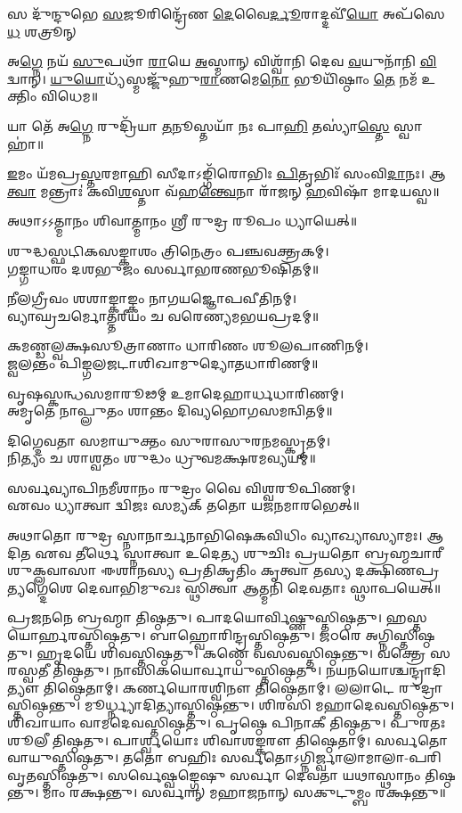 {𑌸 𑌦𑍁᳴𑌨𑍍𑌦𑍁𑌭𑍇 \ul{𑌸}\-𑌜𑍂𑌰𑌿𑌨𑍍𑌦𑍍𑌰𑍇᳴𑌣 \ul{𑌦𑍇}\-𑌵𑍈\-\ul{𑌰𑍍𑌦𑍂}\-𑌰𑌾𑌦𑍍𑌦𑌵𑍀᳴\-\ul{𑌯𑍋} 𑌅𑌪᳴𑌸𑍇\-\ul{𑌧} 𑌶𑌤𑍍𑌰𑍂𑌨𑍍}

𑌅\-\ul{𑌗𑍍𑌨𑍇} 𑌨𑌯᳴ \ul{𑌸𑍁}\-𑌪𑌥𑌾᳴ \ul{𑌰𑌾}\-𑌯𑍇 \ul{𑌅}\-𑌸𑍍𑌮𑌾𑌨𑍍 𑌵𑌿𑌶𑍍𑌵𑌾᳴𑌨𑌿 𑌦𑍇𑌵 \ul{𑌵}\-𑌯𑍁𑌨𑌾᳴𑌨𑌿 \ul{𑌵𑌿}\-𑌦𑍍𑌵𑌾𑌨𑍍। 
\-\ul{𑌯𑍁}\-\-\ul{𑌯𑍋}\-𑌧𑍍𑌯᳴𑌸𑍍𑌮𑌜𑍍𑌜𑍁᳴𑌹𑍁\-\ul{𑌰𑌾}\-𑌣𑌮𑍇\-\ul{𑌨𑍋} 𑌭𑍂𑌯𑌿᳴𑌷𑍍𑌠𑌾𑌂 \ul{𑌤𑍇} 𑌨𑌮᳴ 𑌉𑌕𑍍𑌤𑌿𑌂 𑌵𑌿𑌧𑍇𑌮॥\\

𑌯𑌾 𑌤𑍇᳴ 𑌅\-\ul{𑌗𑍍𑌨𑍇} 𑌰𑍁𑌦𑍍𑌰𑌿᳴𑌯𑌾 \ul{𑌤}\-𑌨𑍂𑌸𑍍𑌤𑌯𑌾᳴ 𑌨𑌃 𑌪𑌾\-\ul{𑌹𑌿} 𑌤𑌸𑍍𑌯𑌾॑\-\ul{𑌸𑍍𑌤𑍇} 𑌸𑍍𑌵𑌾𑌹𑌾॑॥

\-\ul{𑌇}\-𑌮𑌂 𑌯᳴𑌮𑌪𑍍𑌰\-\ul{𑌸𑍍𑌤}\-𑌰𑌮𑌾𑌹𑌿 𑌸𑍀𑌦𑌾𑌽𑌙𑍍𑌗𑌿᳴𑌰𑍋𑌭𑌿𑌃 \ul{𑌪𑌿}\-𑌤𑍃𑌭𑌿𑌃᳴ 𑌸𑌂𑌵𑌿\-\ul{𑌦𑌾}\-𑌨𑌃। 𑌆\-\ul{𑌤𑍍𑌵𑌾} 𑌮𑌨𑍍𑌤𑍍𑌰𑌾𑌃॑ 𑌕𑌵𑌿\-\ul{𑌶}\-𑌸𑍍𑌤𑌾 𑌵᳴𑌹\-\ul{𑌨𑍍𑌤𑍍𑌵𑍇}\-𑌨𑌾 𑌰𑌾᳴𑌜𑌨𑍍 \ul{𑌹}\-𑌵𑌿𑌷𑌾᳴ 𑌮𑌾𑌦𑌯𑌸𑍍𑌵॥\\
{\small \closesection}

𑌅𑌥𑌾𑌽𑌽𑌤𑍍𑌮𑌾𑌨𑌂 𑌶𑌿𑌵𑌾𑌤𑍍𑌮𑌾𑌨𑌂 𑌶𑍍𑌰𑍀 𑌰𑍁𑌦𑍍𑌰 𑌰𑍂𑌪𑌂 𑌧𑍍𑌯𑌾𑌯𑍇𑌤𑍍॥

𑌶𑍁𑌦𑍍𑌧𑌸𑍍𑌫𑌟𑌿𑌕𑌸𑌙𑍍𑌕𑌾𑌶𑌂 𑌤𑍍𑌰𑌿𑌨𑍇𑌤𑍍𑌰𑌂 𑌪𑌞𑍍𑌚𑌵𑌕𑍍𑌤𑍍𑌰𑌕𑌮𑍍।\\
𑌗𑌙𑍍𑌗𑌾𑌧𑌰𑌂 𑌦𑌶𑌭𑍁𑌜𑌂 𑌸𑌰𑍍𑌵𑌾𑌭𑌰𑌣𑌭𑍂𑌷𑌿𑌤𑌮𑍍॥

𑌨𑍀𑌲𑌗𑍍𑌰𑍀𑌵𑌂 𑌶𑌶𑌾𑌙𑍍𑌕𑌾𑌙𑍍𑌕𑌂 𑌨𑌾𑌗𑌯𑌜𑍍𑌞𑍋𑌪𑌵𑍀𑌤𑌿𑌨𑌮𑍍।\\
𑌵𑍍𑌯𑌾𑌘𑍍𑌰𑌚𑌰𑍍𑌮𑍋𑌤𑍍𑌤𑌰𑍀𑌯𑌂 𑌚 𑌵𑌰𑍇𑌣𑍍𑌯𑌮𑌭𑌯𑌪𑍍𑌰𑌦𑌮𑍍॥

𑌕𑌮𑌣𑍍𑌡𑌲𑍍𑌵𑌕𑍍𑌷𑌸𑍂𑌤𑍍𑌰𑌾𑌣𑌾𑌂 𑌧𑌾𑌰𑌿𑌣𑌂 𑌶𑍂𑌲𑌪𑌾𑌣𑌿𑌨𑌮𑍍।\\
𑌜𑍍𑌵𑌲𑌨𑍍𑌤𑌂 𑌪𑌿𑌙𑍍𑌗𑌲𑌜𑌟𑌾𑌶𑌿𑌖𑌾𑌮𑍁𑌦𑍍𑌯𑍋𑌤𑌧𑌾𑌰𑌿𑌣𑌮𑍍॥

𑌵𑍃𑌷𑌸𑍍𑌕𑌨𑍍𑌧𑌸𑌮𑌾𑌰𑍂𑌢𑌮𑍍 𑌉𑌮𑌾𑌦𑍇𑌹𑌾𑌰𑍍𑌧𑌧𑌾𑌰𑌿𑌣𑌮𑍍।\\
𑌅𑌮𑍃𑌤𑍇  𑌨𑌾𑌪𑍍𑌲𑍁𑌤𑌂 𑌶𑌾𑌨𑍍𑌤𑌂 𑌦𑌿𑌵𑍍𑌯𑌭𑍋𑌗𑌸𑌮𑌨𑍍𑌵𑌿𑌤𑌮𑍍॥

𑌦𑌿𑌗𑍍𑌦𑍇𑌵𑌤𑌾 𑌸𑌮𑌾𑌯𑍁𑌕𑍍𑌤𑌂 𑌸𑍁𑌰𑌾𑌸𑍁𑌰𑌨𑌮𑌸𑍍𑌕𑍃𑌤𑌮𑍍।\\
𑌨𑌿𑌤𑍍𑌯𑌂 𑌚 𑌶𑌾𑌶𑍍𑌵𑌤𑌂 𑌶𑍁𑌦𑍍𑌧𑌂 𑌧𑍍𑌰𑍁𑌵𑌮𑌕𑍍𑌷𑌰𑌮𑌵𑍍𑌯𑌯𑌮𑍍॥

𑌸𑌰𑍍𑌵𑌵𑍍𑌯𑌾𑌪𑌿𑌨𑌮𑍀𑌶𑌾𑌨𑌂 𑌰𑍁𑌦𑍍𑌰𑌂 𑌵𑍈 𑌵𑌿𑌶𑍍𑌵𑌰𑍂𑌪𑌿𑌣𑌮𑍍।\\
𑌏𑌵𑌂 𑌧𑍍𑌯𑌾𑌤𑍍𑌵𑌾 𑌦𑍍𑌵𑌿𑌜𑌃 𑌸𑌮𑍍𑌯𑌕𑍍 𑌤𑌤𑍋 𑌯𑌜𑌨𑌮𑌾𑌰𑌭𑍇𑌤𑍍॥

𑌅𑌥𑌾𑌤𑍋 𑌰𑍁𑌦𑍍𑌰 𑌸𑍍𑌨𑌾𑌨𑌾𑌰𑍍𑌚𑌨𑌾𑌭𑌿𑌷𑍇𑌕𑌵𑌿𑌧𑌿𑌂 𑌵𑍍𑌯𑌾𑌖𑍍𑌯𑌾𑌸𑍍𑌯𑌾𑌮𑌃। 𑌆𑌦𑌿𑌤 𑌏𑌵 𑌤𑍀𑌰𑍍𑌥𑍇 𑌸𑍍𑌨𑌾𑌤𑍍𑌵𑌾 𑌉𑌦𑍇𑌤𑍍𑌯 𑌶𑍁𑌚𑌿𑌃
𑌪𑍍𑌰𑌯𑌤𑍋 𑌬𑍍𑌰𑌹𑍍𑌮𑌚𑌾𑌰𑍀 𑌶𑍁𑌕𑍍𑌲𑌵𑌾𑌸𑌾 𑌈𑌶𑌾𑌨𑌸𑍍𑌯 𑌪𑍍𑌰𑌤𑌿𑌕𑍃𑌤𑌿𑌂 𑌕𑍃𑌤𑍍𑌵𑌾 𑌤𑌸𑍍𑌯 𑌦𑌕𑍍𑌷𑌿𑌣𑌪𑍍𑌰𑌤𑍍𑌯𑌗𑍍𑌦𑍇𑌶𑍇 𑌦𑍇𑌵𑌾𑌭𑌿𑌮𑍁𑌖𑌃 𑌸𑍍𑌥𑌿𑌤𑍍𑌵𑌾 𑌆𑌤𑍍𑌮𑌨𑌿 𑌦𑍇𑌵𑌤𑌾𑌃 𑌸𑍍𑌥𑌾𑌪𑌯𑍇𑌤𑍍॥

𑌪𑍍𑌰𑌜𑌨𑌨𑍇 𑌬𑍍𑌰𑌹𑍍𑌮𑌾 𑌤𑌿𑌷𑍍𑌠𑌤𑍁। 𑌪𑌾𑌦𑌯𑍋𑌰𑍍𑌵𑌿𑌷𑍍𑌣𑍁𑌸𑍍𑌤𑌿𑌷𑍍𑌠𑌤𑍁। 
𑌹𑌸𑍍𑌤𑌯𑍋𑌰𑍍𑌹𑌰𑌸𑍍𑌤𑌿𑌷𑍍𑌠𑌤𑍁। 𑌬𑌾𑌹𑍍𑌵𑍋𑌰𑌿𑌨𑍍𑌦𑍍𑌰𑌸𑍍𑌤𑌿𑌷𑍍𑌠𑌤𑍁। 
𑌜𑌠𑌰𑍇 𑌅𑌗𑍍𑌨𑌿𑌸𑍍𑌤𑌿𑌷𑍍𑌠𑌤𑍁। 𑌹𑍃𑌦𑌯𑍇 𑌶𑌿𑌵𑌸𑍍𑌤𑌿𑌷𑍍𑌠𑌤𑍁। 
𑌕𑌣𑍍𑌠𑍇 𑌵𑌸𑌵𑌸𑍍𑌤𑌿𑌷𑍍𑌠𑌨𑍍𑌤𑍁। 𑌵𑌕𑍍𑌤𑍍𑌰𑍇 𑌸𑌰𑌸𑍍𑌵𑌤𑍀 𑌤𑌿𑌷𑍍𑌠𑌤𑍁। 
𑌨𑌾𑌸𑌿𑌕𑌯𑍋𑌰𑍍\-𑌵𑌾𑌯𑍁𑌸𑍍𑌤𑌿𑌷𑍍𑌠𑌤𑍁। 𑌨𑌯𑌨𑌯𑍋𑌶𑍍𑌚𑌨𑍍𑌦𑍍𑌰𑌾𑌦𑌿𑌤𑍍𑌯𑍗 𑌤𑌿𑌷𑍍𑌠𑍇𑌤𑌾𑌮𑍍। 
𑌕𑌰𑍍𑌣𑌯𑍋𑌰𑌶𑍍𑌵𑌿𑌨𑍗 𑌤𑌿𑌷𑍍𑌠𑍇𑌤𑌾𑌮𑍍। 𑌲𑌲𑌾𑌟𑍇 𑌰𑍁𑌦𑍍𑌰𑌾𑌸𑍍𑌤𑌿𑌷𑍍𑌠𑌨𑍍𑌤𑍁। 
𑌮𑍂𑌰𑍍𑌧𑍍𑌨𑍍𑌯𑌾𑌦𑌿𑌤𑍍𑌯𑌾𑌸𑍍𑌤𑌿𑌷𑍍𑌠𑌨𑍍𑌤𑍁। 𑌶𑌿𑌰𑌸𑌿 𑌮𑌹𑌾𑌦𑍇𑌵𑌸𑍍𑌤𑌿𑌷𑍍𑌠𑌤𑍁। 
𑌶𑌿𑌖𑌾𑌯𑌾𑌂 𑌵𑌾𑌮𑌦𑍇𑌵𑌸𑍍𑌤𑌿𑌷𑍍𑌠𑌤𑍁। 𑌪𑍃𑌷𑍍𑌠𑍇 𑌪𑌿𑌨𑌾𑌕𑍀 𑌤𑌿𑌷𑍍𑌠𑌤𑍁। 
𑌪𑍁𑌰𑌤𑌃 𑌶𑍂𑌲𑍀 𑌤𑌿𑌷𑍍𑌠𑌤𑍁। 𑌪𑌾𑌰𑍍𑌶𑍍𑌵𑌯𑍋𑌃 𑌶𑌿𑌵𑌾𑌶𑌙𑍍𑌕𑌰𑍗 𑌤𑌿𑌷𑍍𑌠𑍇𑌤𑌾𑌮𑍍। 
𑌸𑌰𑍍𑌵𑌤𑍋 𑌵𑌾𑌯𑍁𑌸𑍍𑌤𑌿𑌷𑍍𑌠𑌤𑍁। 𑌤𑌤𑍋 𑌬𑌹𑌿𑌃 𑌸𑌰𑍍𑌵𑌤𑍋𑌽𑌗𑍍𑌨𑌿𑌰𑍍𑌜𑍍𑌵𑌾𑌲𑌾𑌮𑌾𑌲𑌾-𑌪𑌰𑌿𑌵𑍃𑌤𑌸𑍍𑌤𑌿𑌷𑍍𑌠𑌤𑍁।
𑌸𑌰𑍍𑌵𑍇𑌷𑍍𑌵𑌙𑍍𑌗𑍇𑌷𑍁 𑌸𑌰𑍍𑌵𑌾 𑌦𑍇𑌵𑌤𑌾 𑌯𑌥𑌾𑌸𑍍𑌥𑌾𑌨𑌂 𑌤𑌿𑌷𑍍𑌠𑌨𑍍𑌤𑍁। 𑌮𑌾𑌂 𑌰𑌕𑍍𑌷𑌨𑍍𑌤𑍁।
\lbrack 𑌸𑌰𑍍𑌵𑌾𑌨𑍍 𑌮𑌹𑌾𑌜𑌨𑌾𑌨𑍍 𑌸𑌕𑍁𑌟𑍁𑌮𑍍𑌬𑌂 𑌰𑌕𑍍𑌷𑌨𑍍𑌤𑍁॥\rbrack

